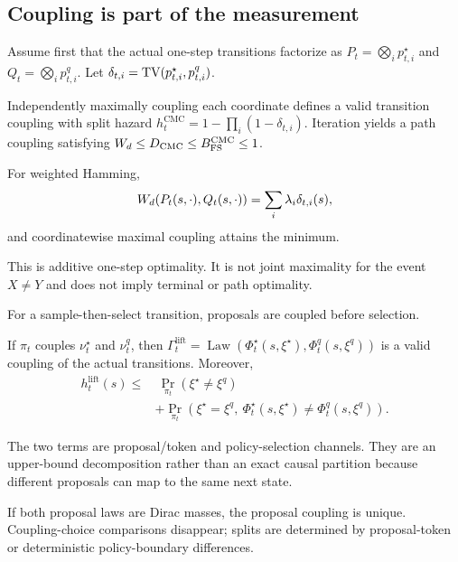 \subsection{Coupling is part of the measurement}
Assume first that the actual one-step transitions factorize as $P_t=\bigotimes_i p_{t,i}^\star$ and $Q_t=\bigotimes_i p_{t,i}^q$. Let $\delta_{t,i}=\mathrm{TV}(p_{t,i}^\star,p_{t,i}^q)$.
\begin{theorem}
\label{thm:cmc}
Independently maximally coupling each coordinate defines a valid transition coupling with split hazard
$h_t^{\mathrm{CMC}}=1-\prod_i(1-\delta_{t,i})$. Iteration yields a path coupling satisfying
$W_{d}\le D_{\mathrm{CMC}}\le B_{\mathrm{FS}}^{\mathrm{CMC}}\le1$.
\end{theorem}
\proofapp
\begin{proposition}
\label{prop:cmc-onestep-opt}
For weighted Hamming,
\begin{equation}
W_{d}(P_t(s,\cdot),Q_t(s,\cdot))
=\sum_i\lambda_i\delta_{t,i}(s),
\label{eq:cmc-opt}
\end{equation}
and coordinatewise maximal coupling attains the minimum.
\end{proposition}
\proofapp
This is additive one-step optimality. It is not joint maximality for the event $X\ne Y$ and does not imply terminal or path optimality.

For a sample-then-select transition, proposals are coupled before selection.
\begin{proposition}
\label{prop:lifted}
If $\pi_t$ couples $\nu_t^\star$ and $\nu_t^q$, then
$\Gamma_t^{\mathrm{lift}}=\operatorname{Law}(\Phi_t^\star(s,\xi^\star),\Phi_t^q(s,\xi^q))$
is a valid coupling of the actual transitions. Moreover,
\begin{align}
 h_t^{\mathrm{lift}}(s)\le&\ \Pr_{\pi_t}(\xi^\star\ne\xi^q)\\
 &+\Pr_{\pi_t}(\xi^\star=\xi^q,\ \Phi_t^\star(s,\xi^\star)\ne\Phi_t^q(s,\xi^q)).
 \label{eq:lift-channels}
\end{align}
\end{proposition}
\proofapp
The two terms are proposal/token and policy-selection channels. They are an upper-bound decomposition rather than an exact causal partition because different proposals can map to the same next state.
\begin{corollary}
\label{cor:det-limit}
If both proposal laws are Dirac masses, the proposal coupling is unique. Coupling-choice comparisons disappear; splits are determined by proposal-token or deterministic policy-boundary differences.
\end{corollary}
\proofapp

